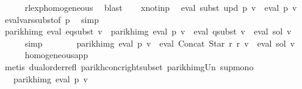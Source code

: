 \begin{isabellebody}
\ \ \ \ \isamarkupfalse%
\ rlexp{\isacharunderscore}{\kern0pt}homogeneous\ \isamarkupfalse%
\ blast\isanewline
\isanewline
\ \ \isamarkupfalse%
\ x{\isacharunderscore}{\kern0pt}not{\isacharunderscore}{\kern0pt}in{\isacharunderscore}{\kern0pt}p\ \isamarkupfalse%
\ {\isachardoublequoteopen}eval\ {\isacharparenleft}{\kern0pt}subst\ {\isacharquery}{\kern0pt}upd\ p{\isacharparenright}{\kern0pt}\ v\ {\isacharequal}{\kern0pt}\ eval\ p\ v{\isachardoublequoteclose}\ \isamarkupfalse%
\ eval{\isacharunderscore}{\kern0pt}vars{\isacharunderscore}{\kern0pt}subst{\isacharbrackleft}{\kern0pt}of\ p{\isacharbrackright}{\kern0pt}\ \isamarkupfalse%
\ simp\isanewline
\ \ \isamarkupfalse%
\ \isamarkupfalse%
\ {\isachardoublequoteopen}parikh{\isacharunderscore}{\kern0pt}img\ {\isacharparenleft}{\kern0pt}eval\ {\isacharquery}{\kern0pt}eq{\isacharunderscore}{\kern0pt}subst\ v{\isacharparenright}{\kern0pt}\ {\isacharequal}{\kern0pt}\ parikh{\isacharunderscore}{\kern0pt}img\ {\isacharparenleft}{\kern0pt}eval\ p\ v\ {\isasymunion}\ eval\ {\isacharquery}{\kern0pt}q{\isacharunderscore}{\kern0pt}subst\ v\ {\isacharat}{\kern0pt}{\isacharat}{\kern0pt}\ eval\ sol\ v{\isacharparenright}{\kern0pt}{\isachardoublequoteclose}\isanewline
\ \ \ \ \isamarkupfalse%
\ simp\isanewline
\ \ \isamarkupfalse%
\ \isamarkupfalse%
\ {\isachardoublequoteopen}{\isasymdots}\ {\isasymsubseteq}\ parikh{\isacharunderscore}{\kern0pt}img\ {\isacharparenleft}{\kern0pt}eval\ p\ v\ {\isasymunion}\ eval\ {\isacharparenleft}{\kern0pt}Concat\ {\isacharparenleft}{\kern0pt}Star\ {\isacharquery}{\kern0pt}r{\isacharparenright}{\kern0pt}\ {\isacharquery}{\kern0pt}r{\isacharparenright}{\kern0pt}\ v\ {\isacharat}{\kern0pt}{\isacharat}{\kern0pt}\ eval\ sol\ v{\isacharparenright}{\kern0pt}{\isachardoublequoteclose}\isanewline
\ \ \ \ \isamarkupfalse%
\ homogeneous{\isacharunderscore}{\kern0pt}app\ \isamarkupfalse%
\ {\isacharparenleft}{\kern0pt}metis\ dual{\isacharunderscore}{\kern0pt}order{\isachardot}{\kern0pt}refl\ parikh{\isacharunderscore}{\kern0pt}conc{\isacharunderscore}{\kern0pt}right{\isacharunderscore}{\kern0pt}subset\ parikh{\isacharunderscore}{\kern0pt}img{\isacharunderscore}{\kern0pt}Un\ sup{\isachardot}{\kern0pt}mono{\isacharparenright}{\kern0pt}\isanewline
\ \ \isamarkupfalse%
\ \isamarkupfalse%
\ {\isachardoublequoteopen}{\isasymdots}\ {\isacharequal}{\kern0pt}\ parikh{\isacharunderscore}{\kern0pt}img\ {\isacharparenleft}{\kern0pt}eval\ p\ v{\isacharparenright}{\kern0pt}\ {\isasymunion}\isanewline

\end{isabellebody}

